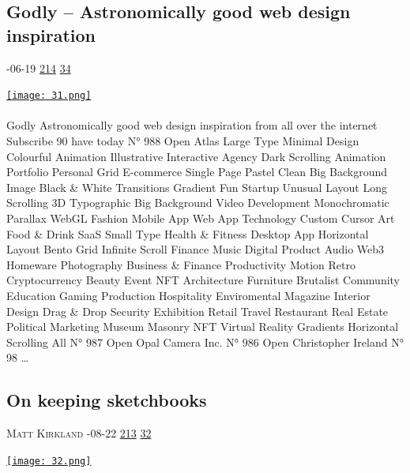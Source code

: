 \documentclass[10pt,a4paper]{article}
\begin{document}
\begin{multicols}{2}
\begin{minipage}{\linewidth}
\subsection{Godly – Astronomically good web design inspiration}
\textsc{\footnotesize
{\scriptsize\faCalendar}-06-19 
{\scriptsize\faThumbsOUp}\space 
\href{http://news.ycombinator.com/item?id=37226805\&utm\_term=comment}{214} 
{\scriptsize\faComments}\space 
\href{http://news.ycombinator.com/item?id=37226805\&utm\_term=comment}{34} 
}
\par\medskip\noindent
\href{https://godly.website/?utm\_source=hackernewsletter\&utm\_medium=email\&utm\_term=design}{
    \texttt{[image: 31.png]}
}
\end{minipage}
\paragraph{}
Godly
Astronomically good web design inspiration from all over the internet
Subscribe
90 have today
N° 988
Open
Atlas
Large Type
Minimal
Design
Colourful
Animation
Illustrative
Interactive
Agency
Dark
Scrolling Animation
Portfolio
Personal
Grid
E-commerce
Single Page
Pastel
Clean
Big Background Image
Black \& White
Transitions
Gradient
Fun
Startup
Unusual Layout
Long Scrolling
3D
Typographic
Big Background Video
Development
Monochromatic
Parallax
WebGL
Fashion
Mobile App
Web App
Technology
Custom Cursor
Art
Food \& Drink
SaaS
Small Type
Health \& Fitness
Desktop App
Horizontal Layout
Bento Grid
Infinite Scroll
Finance
Music
Digital Product
Audio
Web3
Homeware
Photography
Business \& Finance
Productivity
Motion
Retro
Cryptocurrency
Beauty
Event
NFT
Architecture
Furniture
Brutalist
Community
Education
Gaming
Production
Hospitality
Enviromental
Magazine
Interior Design
Drag \& Drop
Security
Exhibition
Retail
Travel
Restaurant
Real Estate
Political
Marketing
Museum
Masonry
NFT
Virtual Reality
Gradients
Horizontal Scrolling
All
N° 987
Open
Opal Camera Inc.
N° 986
Open
Christopher Ireland
N° 98
\dots\par
\noindent\begin{minipage}{\linewidth}
\medskip
\subsection{On keeping sketchbooks}
\textsc{\footnotesize
{\scriptsize\faUser}\space 
Matt Kirkland 
{\scriptsize\faCalendar}-08-22 
{\scriptsize\faThumbsOUp}\space 
\href{http://news.ycombinator.com/item?id=37227606\&utm\_term=comment}{213} 
{\scriptsize\faComments}\space 
\href{http://news.ycombinator.com/item?id=37227606\&utm\_term=comment}{32} 
}
\par\medskip\noindent
\href{https://attainablefelicity.mattkirkland.com/20230822/Sketchbooks.html?utm\_source=hackernewsletter\&utm\_medium=email\&utm\_term=design}{
    \texttt{[image: 32.png]}
}
\end{minipage}

\end{multicols}
\end{document}
